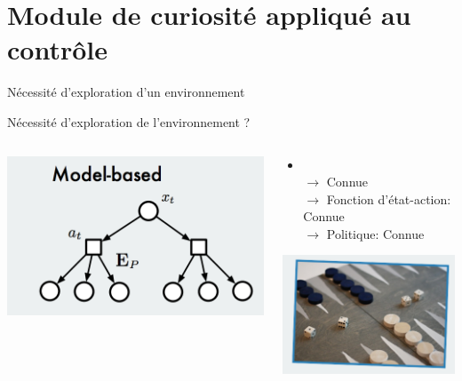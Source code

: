\section{Module de curiosité appliqué au contrôle}
\begin{frame}{Nécessité d'exploration d'un environnement}

    Nécessité d'exploration de l'environnement ?

\begin{columns}[T] %
\begin{column}{.48\textwidth}
\begin{center}
    \includegraphics[scale=.24]{./curiosity/1}
\end{center}
\end{column}%
\hfill%
\begin{column}{.58\textwidth}
\begin{itemize}
    \item {}\\$\rightarrow$ Connue \\ $\rightarrow$ Fonction d'état-action: Connue \\ $\rightarrow$ Politique: Connue
\end{itemize}

\begin{center}
    \bigskip
    \includegraphics[scale=.3]{./curiosity/3}
\end{center}

\end{column}%
\end{columns}


\end{frame}

